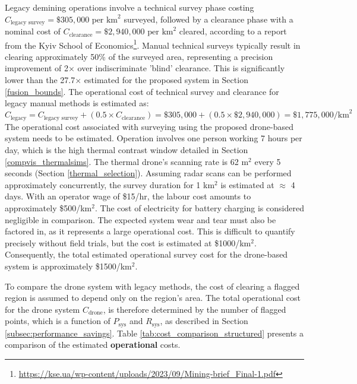Legacy demining operations involve a technical survey phase costing $C_\text{legacy survey} = \$305,000 \text{ per km}^2$ surveyed, followed by a clearance phase with a nominal cost of $C_\text{clearance} = \$2,940,000 \text{ per km}^2$ cleared, according to a report from the Kyiv School of Economics\footnote{\url{https://kse.ua/wp-content/uploads/2023/09/Mining-brief_Final-1.pdf}}. Manual technical surveys typically result in clearing approximately 50\% of the surveyed area, representing a precision improvement of 2$\times$ over indiscriminate 'blind' clearance. This is significantly lower than the 27.7$\times$ estimated for the proposed system in Section \ref{fusion_bounds}. The operational cost of technical survey and clearance for legacy manual methods is estimated as:
\begin{equation}
C_{\text{legacy}} = C_{\text{legacy survey}} + (0.5 \times C_{\text{clearance}}) = \$305,000 + (0.5 \times \$2,940,000) = \$1,775,000 \text{/km}^2 
\end{equation}
The operational cost associated with surveying using the proposed drone-based system needs to be estimated. Operation involves one person working 7 hours per day, which is the high thermal contrast window detailed in Section \ref{compvis_thermalsims}. The thermal drone's scanning rate is 62 m$^2$ every 5 seconds (Section \ref{thermal_selection}). Assuming radar scans can be performed approximately concurrently, the survey duration for 1 km$^2$ is estimated at $\approx$ 4 days. With an operator wage of \$15/hr, the labour cost amounts to approximately \$500/km$^2$. The cost of electricity for battery charging is considered negligible in comparison. The expected system wear and tear must also be factored in, as it represents a large operational cost. This is difficult to quantify precisely without field trials, but the cost is estimated at \$1000/km$^2$. Consequently, the total estimated operational survey cost for the drone-based system is approximately \$1500/km$^2$.

To compare the drone system with legacy methods, the cost of clearing a flagged region is assumed to depend only on the region's area. The total operational cost for the drone system $C_{\text{drone}}$, is therefore determined by the number of flagged points, which is a function of $P_\text{sys}$ and $R_\text{sys}$, as described in Section \ref{subsec:performance_savings}. Table \ref{tab:cost_comparison_structured} presents a comparison of the estimated \textbf{operational} costs.

